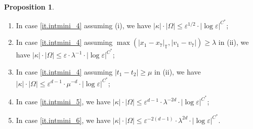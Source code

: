 \documentclass[10pt, reqno]{amsart}
\newcommand{\Tb}{\mathbb T}
\theoremstyle{definition}
\newtheorem{proposition}[theorem]{Proposition}
\theoremstyle{remark}
\numberwithin{equation}{section}
\begin{document}
\begin{proposition}
\begin{enumerate}
\item\label{it.intmini_n1} In case \ref{it.intmini_4} assuming (i), we have $|\kappa|\cdot|\Omega|\leq \varepsilon^{1/2}\cdot|\log\varepsilon|^{C^*}$;
\item\label{it.intmini_n2} In case \ref{it.intmini_4} assuming $\max(|x_1-x_7|_\Tb,|v_1-v_7|)\geq \lambda$ in (ii), we have $|\kappa|\cdot|\Omega|\leq \varepsilon\cdot\lambda^{-1}\cdot|\log\varepsilon|^{C^*}$;
\item\label{it.intmini_n3} In case \ref{it.intmini_4} assuming $|t_1-t_2|\geq\mu$ in (ii), we have $|\kappa|\cdot|\Omega|\leq \varepsilon^{d-1}\cdot\mu^{-d}\cdot|\log\varepsilon|^{C^*}$;
\item\label{it.intmini_n4} In case \ref{it.intmini_5}, we have $|\kappa|\cdot|\Omega|\leq \varepsilon^{d-1}\cdot\lambda^{-2d}\cdot|\log\varepsilon|^{C^*}$;
\item\label{it.intmini_n5} In case \ref{it.intmini_6}, we have $|\kappa|\cdot|\Omega|\leq \varepsilon^{-2(d-1)}\cdot \lambda^{2d}\cdot|\log\varepsilon|^{C^*}$.
\end{enumerate}
\end{proposition}
\end{document}
